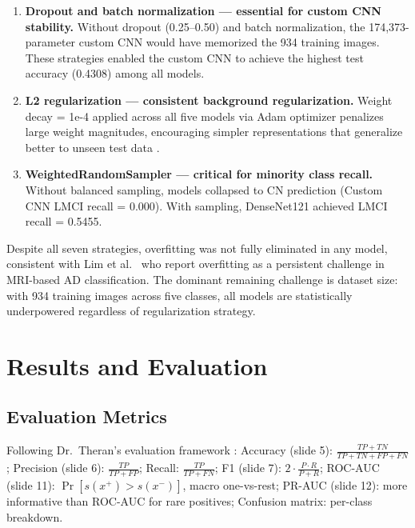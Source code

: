 \documentclass[12pt, a4paper]{article}
\begin{document}
\begin{enumerate}
    \item \textbf{Dropout and batch normalization ---
    essential for custom CNN stability.} Without
    dropout (0.25--0.50) and batch normalization,
    the 174,373-parameter custom CNN would have
    memorized the 934 training images. These strategies
    enabled the custom CNN to achieve the highest test
    accuracy (0.4308) among all models.

    \item \textbf{L2 regularization --- consistent
    background regularization.} Weight decay = 1e-4
    applied across all five models via Adam optimizer
    penalizes large weight magnitudes, encouraging
    simpler representations that generalize better
    to unseen test data \cite{lim2022}.

    \item \textbf{WeightedRandomSampler --- critical
    for minority class recall.} Without balanced
    sampling, models collapsed to CN prediction
    (Custom CNN LMCI recall = 0.000). With sampling,
    DenseNet121 achieved LMCI recall = 0.5455.
\end{enumerate}

Despite all seven strategies, overfitting was not
fully eliminated in any model, consistent with
Lim et al.\ \cite{lim2022} who report overfitting
as a persistent challenge in MRI-based AD
classification. The dominant remaining challenge
is dataset size: with 934 training images across
five classes, all models are statistically
underpowered regardless of regularization strategy.

\section{Results and Evaluation}

\subsection{Evaluation Metrics}

Following Dr.\ Theran's evaluation framework
\cite{theran2026metrics}: Accuracy (slide 5):
$\frac{TP+TN}{TP+TN+FP+FN}$; Precision (slide 6):
$\frac{TP}{TP+FP}$; Recall: $\frac{TP}{TP+FN}$;
F1 (slide 7): $2\cdot\frac{P\cdot R}{P+R}$; ROC-AUC
(slide 11): $\Pr[s(x^+)>s(x^-)]$, macro one-vs-rest;
PR-AUC (slide 12): more informative than ROC-AUC for
rare positives; Confusion matrix: per-class breakdown.
\end{document}
